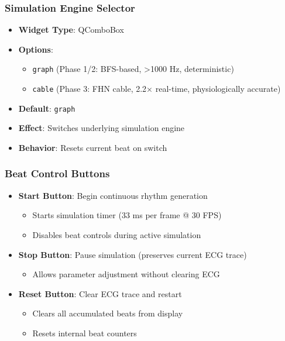 \documentclass[11pt, a4paper]{article}
\begin{document}
\subsubsection{Simulation Engine Selector}
\begin{itemize}
    \item \textbf{Widget Type}: QComboBox
    \item \textbf{Options}: 
    \begin{itemize}
        \item \texttt{graph} (Phase 1/2: BFS-based, >1000 Hz, deterministic)
        \item \texttt{cable} (Phase 3: FHN cable, 2.2× real-time, physiologically accurate)
    \end{itemize}
    \item \textbf{Default}: \texttt{graph}
    \item \textbf{Effect}: Switches underlying simulation engine
    \item \textbf{Behavior}: Resets current beat on switch
\end{itemize}

\subsubsection{Beat Control Buttons}
\begin{itemize}
    \item \textbf{Start Button}: Begin continuous rhythm generation
    \begin{itemize}
        \item Starts simulation timer (33 ms per frame @ 30 FPS)
        \item Disables beat controls during active simulation
    \end{itemize}
    \item \textbf{Stop Button}: Pause simulation (preserves current ECG trace)
    \begin{itemize}
        \item Allows parameter adjustment without clearing ECG
    \end{itemize}
    \item \textbf{Reset Button}: Clear ECG trace and restart
    \begin{itemize}
        \item Clears all accumulated beats from display
        \item Resets internal beat counters
    \end{itemize}
\end{itemize}
\end{document}
